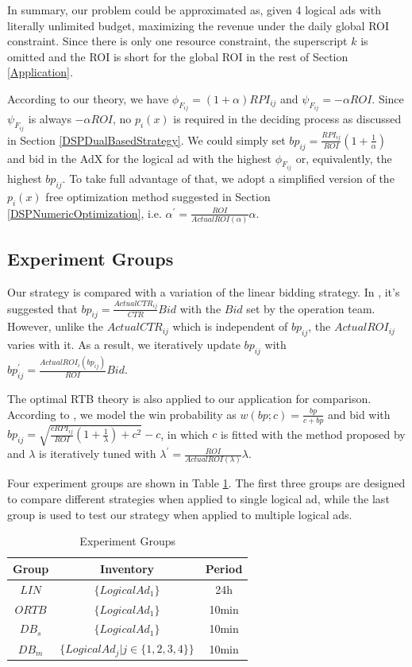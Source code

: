 \documentclass{article}
\newcommand{\sbp}{bp_{ij}}
\newcommand{\sCPI}{RPI_{ij}}
\newcommand{\sF}{F_{ij}}
\newcommand{\pprob}{\phi}
\newcommand{\pcost}{\psi}
\newcommand{\ortbbp}{\sqrt{\frac{c\sCPI}{ROI}(1+\frac{1}{\lambda})+c^2}-c}
\newcommand{\dbbp}{\frac{\sCPI}{ROI}(1+\frac{1}{\alpha})}
\newcommand{\liniter}{\sbp^{'}=\frac{ActualROI_i(\sbp)}{ROI}Bid}
\newcommand{\ortbiter}{\lambda^{'}=\frac{ROI}{ActualROI(\lambda)}\lambda}
\newcommand{\dbiter}{\alpha^{'} = \frac{ROI}{ActualROI(\alpha)}\alpha}
\begin{document}
In summary, our problem could be approximated as, given 4 logical ads with literally unlimited budget,
    maximizing the revenue under the daily global ROI constraint.
Since there is only one resource constraint, the superscript $k$ is omitted and
    the ROI is short for the global ROI in the rest of Section \ref{Application}.

According to our theory, we have $\pprob_{\sF}=(1+\alpha)\sCPI$ and $\pcost_{\sF}=-\alpha{}ROI$.
Since $\pcost_{\sF}$ is always $-\alpha{}ROI$, no $p_i(x)$ is required in the deciding process as discussed in Section \ref{DSPDualBasedStrategy}.
We could simply set $\sbp = \dbbp$ and bid in the AdX for the logical ad
    with the highest $\pprob_{\sF}$ or, equivalently, the highest $\sbp$.
To take full advantage of that, we adopt a simplified version of the $p_i(x)$ free optimization method
    suggested in Section \ref{DSPNumericOptimization}, i.e. $\dbiter$.

\subsection{Experiment Groups}

Our strategy is compared with a variation of the linear bidding strategy.
In \cite{M6D}, it's suggested that $\sbp=\frac{ActualCTR_{ij}}{CTR}Bid$ with the $Bid$ set by the operation team.
However, unlike the $ActualCTR_{ij}$ which is independent of $\sbp$, the $ActualROI_{ij}$ varies with it.
As a result, we iteratively update $\sbp$ with $\liniter$.

The optimal RTB theory is also applied to our application for comparison.
According to \cite{WeinanZhang2014}, we model the win probability as $w(bp;c)=\frac{bp}{c+bp}$ and bid with $\sbp=\ortbbp$,
    in which $c$ is fitted with the method proposed by \cite{Wu2015} and $\lambda$ is iteratively tuned with $\ortbiter$.

Four experiment groups are shown in Table \ref{TableExperimentGroups}.
The first three groups are designed to compare different strategies when applied to single logical ad,
    while the last group is used to test our strategy when applied to multiple logical ads.

\begin{table}
\caption{Experiment Groups\label{TableExperimentGroups}}
\begin{center}
\begin{tabular}{c|c|c}
\hline
\textbf{Group}    & \textbf{Inventory}         & \textbf{Period} \\
\hline
\hline
$LIN$    & $\{LogicalAd_1\}$                   & 24h \\
$ORTB$   & $\{LogicalAd_1\}$                   & 10min \\
$DB_{s}$ & $\{LogicalAd_1\}$                   & 10min \\
$DB_{m}$ & $\{LogicalAd_j|j \in \{1,2,3,4\}\}$ & 10min \\
\hline
\end{tabular}
\end{center}
\end{table}
\end{document}
